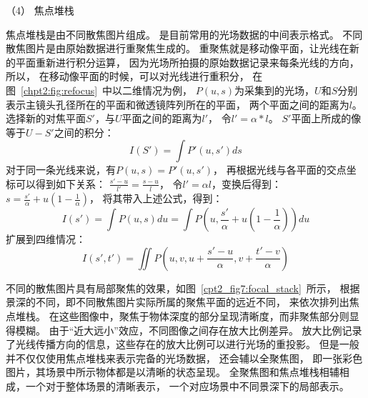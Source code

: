 （4）
焦点堆栈
\par
焦点堆栈是由不同散焦图片组成。
是目前常用的光场数据的中间表示格式。
不同散焦图片是由原始数据进行重聚焦生成的。
重聚焦就是移动像平面，让光线在新的平面重新进行积分运算，
因为光场所拍摄的原始数据记录来每条光线的方向，所以，
在移动像平面的时候，可以对光线进行重积分，
在图~\ref{chpt2:fig:refocus}~中以二维情况为例，
$P(u,s)$为采集到的光场，$U$和$S$分别表示主镜头孔径所在的平面和微透镜阵列所在的平面，
两个平面之间的距离为$l$。选择新的对焦平面${S}' $，与$U$平面之间的距离为${l}' $，
令${l}' =\alpha * l  $。
${S}' $平面上所成的像等于$U-{S}' $之间的积分：
\begin{equation}
I\left ( {S}'  \right )  = \int {P}'\left ( u, s' \right ) ds 
\end{equation}
对于同一条光线来说，有$P\left ( u,s \right ) = P' \left ( u, s' \right ) $，
再根据光线与各平面的交点坐标可以得到如下关系：
$ \frac{{s}' - u}{{l}'} = \frac{s - u}{l} $，
令${l}' = \alpha l$，变换后得到：
$s = \frac{{s}'}{\alpha } + u\left ( 1 - \frac{1}{\alpha }  \right )  $，
将其带入上述公式，得到：
\begin{equation}
	I({s}') = \int P(u,s) du = \int P(u, \frac{s'}{\alpha } + u(1-\frac{1}{\alpha }))du
\end{equation}
扩展到四维情况：
\begin{equation}
	I(s',t') = \iint P(u, v, u + \frac{s' - u}{\alpha }, v + \frac{t' - v}{\alpha })
\end{equation}


不同的散焦图片具有局部聚焦的效果，如图~\ref{cpt2_fig7:focal_stack}~所示，
根据景深的不同，即不同散焦图片实际所属的聚焦平面的远近不同，
来依次排列出焦点堆栈。
在这些图像中，聚焦于物体深度的部分呈现清晰度，而非聚焦部分则显得模糊。
由于“近大远小”效应，不同图像之间存在放大比例差异。
放大比例记录了光线传播方向的信息，这些存在的放大比例可以进行光场的重投影。
但是一般并不仅仅使用焦点堆栈来表示完备的光场数据，
还会辅以全聚焦图，
即一张彩色图片，其场景中所示物体都是以清晰的状态呈现。
全聚焦图和焦点堆栈相辅相成，一个对于整体场景的清晰表示，
一个对应场景中不同景深下的局部表示。






